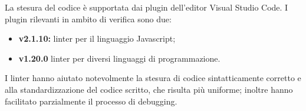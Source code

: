 La stesura del codice è supportata dai plugin dell'editor Visual Studio Code. I plugin rilevanti in ambito di verifica sono due:
\begin{itemize}
    \item \textbf{ v2.1.10:}  linter per il linguaggio Javascript;
    \item \textbf{ v1.20.0}  linter per diversi linguaggi di programmazione.
\end{itemize} 

I linter hanno aiutato notevolmente la stesura di codice sintatticamente corretto e alla standardizzazione del codice scritto, che risulta più uniforme; inoltre hanno facilitato parzialmente il
processo di debugging.
